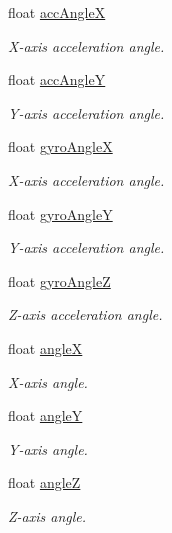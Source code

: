\begin{DoxyCompactItemize}
float \hyperlink{class_loom___m_p_u6050_ab8ccba95253cd13a7505927d07a81abc}{acc\+AngleX}
\begin{DoxyCompactList}\small\item\em X-\/axis acceleration angle. \end{DoxyCompactList}\item 
float \hyperlink{class_loom___m_p_u6050_a54de31e46d5c353b521483bcb88832c2}{acc\+AngleY}
\begin{DoxyCompactList}\small\item\em Y-\/axis acceleration angle. \end{DoxyCompactList}\item 
float \hyperlink{class_loom___m_p_u6050_a291abc624cd3687d6120fa406e362391}{gyro\+AngleX}
\begin{DoxyCompactList}\small\item\em X-\/axis acceleration angle. \end{DoxyCompactList}\item 
float \hyperlink{class_loom___m_p_u6050_a1d1cde22eab898d09d653f4c001c0127}{gyro\+AngleY}
\begin{DoxyCompactList}\small\item\em Y-\/axis acceleration angle. \end{DoxyCompactList}\item 
float \hyperlink{class_loom___m_p_u6050_a78da02da066a030873cf72ee36026a64}{gyro\+AngleZ}
\begin{DoxyCompactList}\small\item\em Z-\/axis acceleration angle. \end{DoxyCompactList}\item 
float \hyperlink{class_loom___m_p_u6050_a3f223a2721a44ff4d49a6194189a55c4}{angleX}
\begin{DoxyCompactList}\small\item\em X-\/axis angle. \end{DoxyCompactList}\item 
float \hyperlink{class_loom___m_p_u6050_acccd878ef904048c3e770011f2f36a1c}{angleY}
\begin{DoxyCompactList}\small\item\em Y-\/axis angle. \end{DoxyCompactList}\item 
float \hyperlink{class_loom___m_p_u6050_a8d8c30186abcda908795de978a5f6cd3}{angleZ}
\begin{DoxyCompactList}\small\item\em Z-\/axis angle. \end{DoxyCompactList}\end{DoxyCompactItemize}
